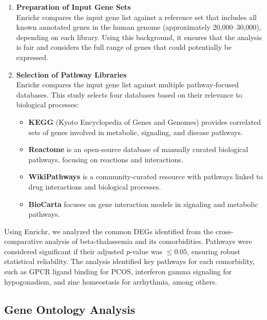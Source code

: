 \begin{enumerate}
    \item \textbf{Preparation of Input Gene Sets} \\
          Enrichr compares the input gene list against a reference set that includes all known annotated genes in the human genome (approximately 20,000--30,000), depending on each library. Using this background, it ensures that the analysis is fair and considers the full range of genes that could potentially be expressed.
    \item \textbf{Selection of Pathway Libraries} \\
          Enrichr compares the input gene list against multiple pathway-focused databases. This study selects four databases based on their relevance to biological processes:
          \begin{itemize}
              \item \textbf{KEGG} (Kyoto Encyclopedia of Genes and Genomes) provides correlated sets of genes involved in metabolic, signaling, and disease pathways.
              \item \textbf{Reactome} is an open-source database of manually curated biological pathways, focusing on reactions and interactions.
              \item \textbf{WikiPathways} is a community-curated resource with pathways linked to drug interactions and biological processes.
              \item \textbf{BioCarta} focuses on gene interaction models in signaling and metabolic pathways.
          \end{itemize}
\end{enumerate}

Using Enrichr, we analyzed the common DEGs identified from the cross-comparative analysis of beta-thalassemia and its comorbidities. Pathways were considered significant if their adjusted $p$-value was $\leq 0.05$, ensuring robust statistical reliability. The analysis identified key pathways for each comorbidity, such as GPCR ligand binding for PCOS, interferon gamma signaling for hypogonadism, and zinc homeostasis for arrhythmia, among others.

\vspace*{-\parskip} %
\subsection{Gene Ontology Analysis}
\label{sec:sec3_4_5}

